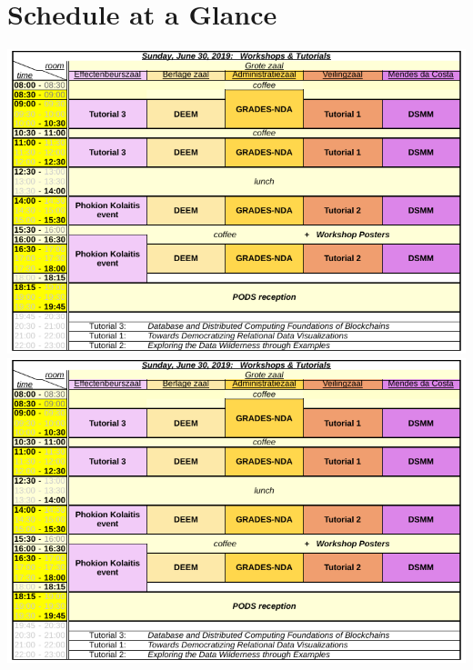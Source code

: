 
\clearpage
\ifodd\value{page}\hbox{}\newpage\fi

\section{Schedule at a Glance}


\ifodd\value{page}
\includegraphics[angle=90,width=.95\textwidth]{schedule/p1.pdf}%
\else
\includegraphics[angle=270,width=.95\textwidth]{schedule/p1.pdf}%
\fi

\newpage


